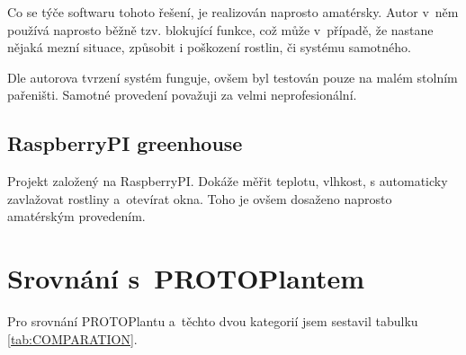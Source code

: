 Co se týče softwaru tohoto řešení, je realizován naprosto amatérsky.
Autor v~něm používá naprosto běžně tzv. blokující funkce, což může v~případě, že nastane nějaká mezní situace, způsobit i poškození rostlin, či systému samotného.

Dle autorova tvrzení systém funguje, ovšem byl testován pouze na malém stolním pařeništi.
Samotné provedení považuji za velmi neprofesionální.

\subsection{RaspberryPI greenhouse \cite{RPIGREENHOUSE}}
Projekt založený na RaspberryPI. 
Dokáže měřit teplotu, vlhkost, s automaticky zavlažovat rostliny a~otevírat okna.
Toho je ovšem dosaženo naprosto amatérským provedením.

\section{Srovnání s~PROTOPlantem}
Pro srovnání PROTOPlantu a~těchto dvou kategorií jsem sestavil tabulku \ref{tab:COMPARATION}.

